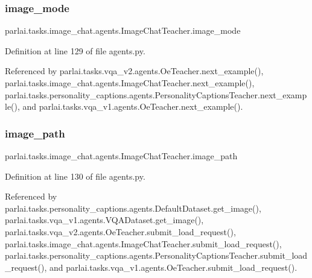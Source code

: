 \subsubsection{\texorpdfstring{image\+\_\+mode}{image\_mode}}
{\footnotesize\ttfamily parlai.\+tasks.\+image\+\_\+chat.\+agents.\+Image\+Chat\+Teacher.\+image\+\_\+mode}



Definition at line 129 of file agents.\+py.



Referenced by parlai.\+tasks.\+vqa\+\_\+v2.\+agents.\+Oe\+Teacher.\+next\+\_\+example(), parlai.\+tasks.\+image\+\_\+chat.\+agents.\+Image\+Chat\+Teacher.\+next\+\_\+example(), parlai.\+tasks.\+personality\+\_\+captions.\+agents.\+Personality\+Captions\+Teacher.\+next\+\_\+example(), and parlai.\+tasks.\+vqa\+\_\+v1.\+agents.\+Oe\+Teacher.\+next\+\_\+example().

\mbox{\label{classparlai_1_1tasks_1_1image__chat_1_1agents_1_1ImageChatTeacher_a76af41b0787179f96a515407deb9a26a}} 
\subsubsection{\texorpdfstring{image\+\_\+path}{image\_path}}
{\footnotesize\ttfamily parlai.\+tasks.\+image\+\_\+chat.\+agents.\+Image\+Chat\+Teacher.\+image\+\_\+path}



Definition at line 130 of file agents.\+py.



Referenced by parlai.\+tasks.\+personality\+\_\+captions.\+agents.\+Default\+Dataset.\+get\+\_\+image(), parlai.\+tasks.\+vqa\+\_\+v1.\+agents.\+V\+Q\+A\+Dataset.\+get\+\_\+image(), parlai.\+tasks.\+vqa\+\_\+v2.\+agents.\+Oe\+Teacher.\+submit\+\_\+load\+\_\+request(), parlai.\+tasks.\+image\+\_\+chat.\+agents.\+Image\+Chat\+Teacher.\+submit\+\_\+load\+\_\+request(), parlai.\+tasks.\+personality\+\_\+captions.\+agents.\+Personality\+Captions\+Teacher.\+submit\+\_\+load\+\_\+request(), and parlai.\+tasks.\+vqa\+\_\+v1.\+agents.\+Oe\+Teacher.\+submit\+\_\+load\+\_\+request().

